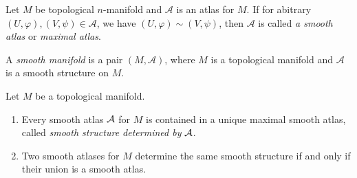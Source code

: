 \begin{definition}
    Let $M$ be topological $n$-manifold and $\mathcal{A}$ is an atlas for $M$. If for abitrary $(U,\varphi), (V,\psi) \in \mathcal{A}$, we have $(U,\varphi) \sim (V,\psi)$,  then $\mathcal{A}$ is called \textit{a smooth atlas} or \textit{maximal atlas}.
\end{definition}
\begin{definition}
    A \textit{smooth manifold} is a pair $(M,\mathcal{A})$, where $M$ is a topological manifold and $\mathcal{A}$ is a smooth structure on $M$.
\end{definition}
\begin{proposition}
    Let $M$ be a topological manifold.
    \begin{enumerate}
        \item Every smooth atlas $\mathcal{A}$ for $M$ is contained in a unique maximal smooth atlas, called \textit{smooth structure determined by }$\mathcal{A}$.
        \item Two smooth atlases for $M$ determine the same smooth structure if and only if their union is a smooth atlas.
    \end{enumerate}
\end{proposition}
